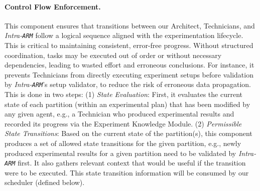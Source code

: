 \paragraph{Control Flow Enforcement.}
This component ensures that transitions between our Architect, Technicians, and \textit{Intra-\texttt{ARM}}
follow a logical sequence aligned with the experimentation lifecycle. 
This is critical to maintaining consistent, error-free progress. Without structured coordination, tasks may be executed out of order or without necessary dependencies, leading to wasted effort and erroneous conclusions.
For instance, it prevents Technicians from directly executing experiment setups before validation by \textit{Intra-\texttt{ARM}}'s setup validator, to reduce the risk of erroneous data propagation.
This is done in two steps:
(1) \textit{State Evaluation}: First, it evaluates the current state of each partition (within an experimental plan) that has been modified by any given agent, e.g., a Technician who produced experimental results and recorded its progress via the Experiment Knowledge Module.
(2) \textit{Permissible State Transitions}: Based on the current state of the partition(s), this component produces a set of allowed state transitions for the given partition, e.g., newly produced experimental results for a given partition need to be validated by \textit{Intra-\texttt{ARM}} first. It also gathers relevant context that would be useful if the transition were to be executed. 
This state transition information will be consumed by our scheduler (defined below). 
